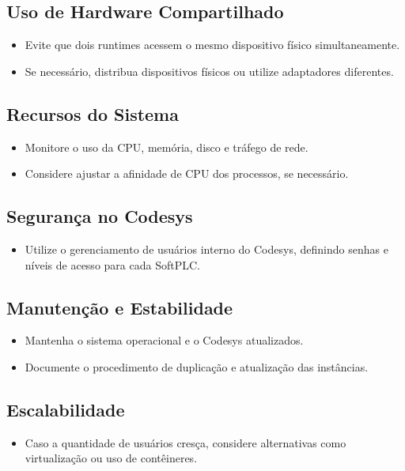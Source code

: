 \documentclass[12pt,a4paper]{article}
\begin{document}
\subsection*{Uso de Hardware Compartilhado}
\begin{itemize}[label=\textbullet]
  \item Evite que dois runtimes acessem o mesmo dispositivo físico simultaneamente.
  \item Se necessário, distribua dispositivos físicos ou utilize adaptadores diferentes.
\end{itemize}

\subsection*{Recursos do Sistema}
\begin{itemize}[label=\textbullet]
  \item Monitore o uso da CPU, memória, disco e tráfego de rede.
  \item Considere ajustar a afinidade de CPU dos processos, se necessário.
\end{itemize}

\subsection*{Segurança no Codesys}
\begin{itemize}[label=\textbullet]
  \item Utilize o gerenciamento de usuários interno do Codesys, definindo senhas e níveis de acesso para cada SoftPLC.
\end{itemize}

\subsection*{Manutenção e Estabilidade}
\begin{itemize}[label=\textbullet]
  \item Mantenha o sistema operacional e o Codesys atualizados.
  \item Documente o procedimento de duplicação e atualização das instâncias.
\end{itemize}

\subsection*{Escalabilidade}
\begin{itemize}[label=\textbullet]
  \item Caso a quantidade de usuários cresça, considere alternativas como virtualização ou uso de contêineres.
\end{itemize}
\end{document}
